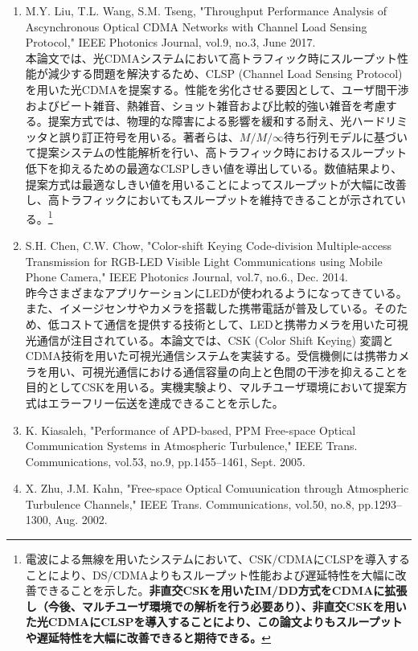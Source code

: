 ﻿\documentclass[a4j,10pt]{jarticle}
\begin{document}
\begin{enumerate}
%
\item M.Y. Liu, T.L. Wang, S.M. Tseng, 
"Throughput Performance Analysis of Ascynchronous Optical CDMA Networks 
with Channel Load Sensing Protocol," 
IEEE Photonics Journal, vol.9, no.3, June 2017.\\
本論文では、光CDMAシステムにおいて高トラフィック時にスループット性能が減少する問題を解決するため、CLSP (Channel Load Sensing Protocol) を用いた光CDMAを提案する。性能を劣化させる要因として、ユーザ間干渉およびビート雑音、熱雑音、ショット雑音および比較的強い雑音を考慮する。提案方式では、物理的な障害による影響を緩和する耐え、光ハードリミッタと誤り訂正符号を用いる。著者らは、$M/M/\infty$待ち行列モデルに基づいて提案システムの性能解析を行い、高トラフィック時におけるスループット低下を抑えるための最適なCLSPしきい値を導出している。数値結果より、提案方式は最適なしきい値を用いることによってスループットが大幅に改善し、高トラフィックにおいてもスループットを維持できることが示されている。\footnote{電波による無線を用いたシステムにおいて、CSK/CDMAにCLSPを導入することにより、DS/CDMAよりもスループット性能および遅延特性を大幅に改善できることを示した。\bf{非直交CSKを用いたIM/DD方式をCDMAに拡張し（今後、マルチユーザ環境での解析を行う必要あり）、非直交CSKを用いた光CDMAにCLSPを導入することにより、この論文よりもスループットや遅延特性を大幅に改善できると期待}できる。}
%
\item S.H. Chen, C.W. Chow, 
"Color-shift Keying Code-division Multiple-access Transmission for RGB-LED Visible Light Communications using Mobile Phone Camera," 
IEEE Photonics Journal, vol.7, no.6., Dec. 2014. \\
昨今さまざまなアプリケーションにLEDが使われるようになってきている。また、イメージセンサやカメラを搭載した携帯電話が普及している。そのため、低コストて通信を提供する技術として、LEDと携帯カメラを用いた可視光通信が注目されている。本論文では、CSK (Color Shift Keying) 変調とCDMA技術を用いた可視光通信システムを実装する。受信機側には携帯カメラを用い、可視光通信における通信容量の向上と色間の干渉を抑えることを目的としてCSKを用いる。実機実験より、マルチユーザ環境において提案方式はエラーフリー伝送を達成できることを示した。
%
\item K. Kiasaleh, 
"Performance of APD-based, PPM Free-space Optical Communication Systems in Atmospheric Turbulence," 
IEEE Trans. Communications, vol.53, no.9, pp.1455--1461, Sept. 2005. 
%
\item X. Zhu, J.M. Kahn, 
"Free-space Optical Comuunication through Atmospheric Turbulence Channels," 
IEEE Trans. Communications, vol.50, no.8, pp.1293--1300, Aug. 2002.\\

\end{enumerate}
\end{document}
